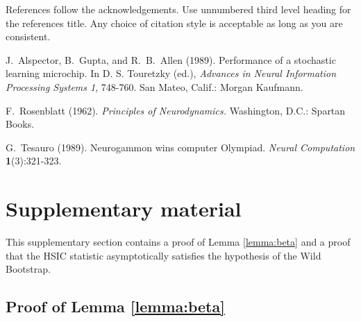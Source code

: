 \documentclass[]{article}
\begin{document}
References follow the acknowledgements.  Use unnumbered third level
heading for the references title.  Any choice of citation style is
acceptable as long as you are consistent.


J.~Alspector, B.~Gupta, and R.~B.~Allen  (1989). Performance of a
stochastic learning microchip.  In D. S. Touretzky (ed.), {\it Advances
in Neural Information Processing Systems 1}, 748-760.  San Mateo, Calif.:
Morgan Kaufmann.

F.~Rosenblatt (1962). {\it Principles of Neurodynamics.} Washington,
D.C.: Spartan Books.

G.~Tesauro (1989). Neurogammon wins computer Olympiad.  {\it Neural
Computation} {\bf 1}(3):321-323.

\appendix
\onecolumn

\section{Supplementary material}
This supplementary section contains a proof of Lemma \ref{lemma:beta} and a proof that the HSIC statistic asymptotically satisfies the hypothesis of the Wild Bootstrap.

\subsection{Proof of Lemma \ref{lemma:beta}}
\end{document}
